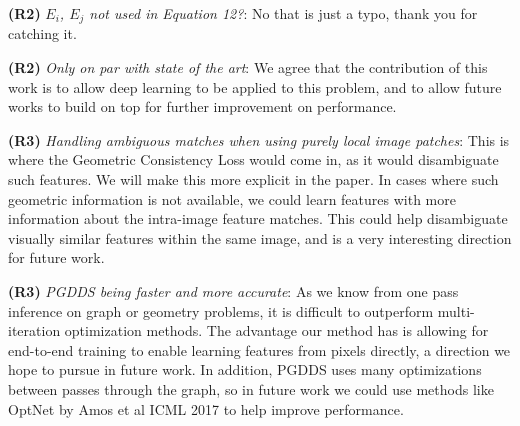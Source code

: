 \documentclass[10pt,twocolumn,letterpaper]{article}
\begin{document}
\textbf{(R2)} \textit{$E_i$, $E_j$ not used in Equation 12?}:
No that is just a typo, thank you for catching it.

\textbf{(R2)} \textit{Only on par with state of the art}:
We agree that the contribution of this work is to allow deep learning to be applied to this problem, and to allow future works to build on top for further improvement on performance.

\textbf{(R3)} \textit{Handling ambiguous matches when using purely local image patches}:
This is where the Geometric Consistency Loss would come in, as it would disambiguate such features.
We will make this more explicit in the paper.
In cases where such geometric information is not available, we could learn features with more information about the intra-image feature matches.
This could help disambiguate visually similar features within the same image, and is a very interesting direction for future work.

\textbf{(R3)} \textit{PGDDS being faster and more accurate}:
As we know from one pass inference on graph or geometry problems, it is difficult to outperform multi-iteration optimization methods.
The advantage our method has is allowing for end-to-end training to enable learning features from pixels directly, a direction we hope to pursue in future work.
In addition, PGDDS uses many optimizations between passes through the graph, so in future work we could use methods like OptNet by Amos et al ICML 2017 to help improve performance.


% 
% 
\end{document}
